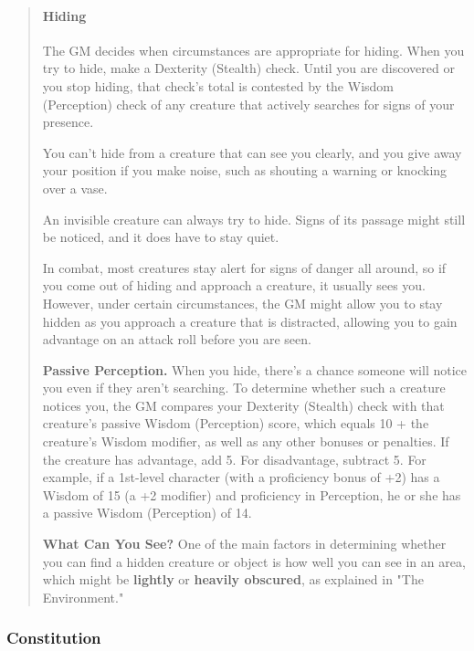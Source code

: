 \documentclass[
]{article}
\begin{document}
\begin{quote}
\mbox{}%
\hypertarget{hiding}{%
\paragraph{Hiding}\label{hiding}}

The GM decides when circumstances are appropriate for hiding. When you
try to hide, make a Dexterity (Stealth) check. Until you are discovered
or you stop hiding, that check's total is contested by the Wisdom
(Perception) check of any creature that actively searches for signs of
your presence.

You can't hide from a creature that can see you clearly, and you give
away your position if you make noise, such as shouting a warning or
knocking over a vase.

An invisible creature can always try to hide. Signs of its passage might
still be noticed, and it does have to stay quiet.

In combat, most creatures stay alert for signs of danger all around, so
if you come out of hiding and approach a creature, it usually sees you.
However, under certain circumstances, the GM might allow you to stay
hidden as you approach a creature that is distracted, allowing you to
gain advantage on an attack roll before you are seen.

\textbf{Passive Perception.} When you hide, there's a chance someone
will notice you even if they aren't searching. To determine whether such
a creature notices you, the GM compares your Dexterity (Stealth) check
with that creature's passive Wisdom (Perception) score, which equals 10
+ the creature's Wisdom modifier, as well as any other bonuses or
penalties. If the creature has advantage, add 5. For disadvantage,
subtract 5. For example, if a 1st-level character (with a proficiency
bonus of +2) has a Wisdom of 15 (a +2 modifier) and proficiency in
Perception, he or she has a passive Wisdom (Perception) of 14.

\textbf{What Can You See?} One of the main factors in determining
whether you can find a hidden creature or object is how well you can see
in an area, which might be \textbf{lightly} or \textbf{heavily
obscured}, as explained in "The Environment."
\end{quote}

\hypertarget{constitution}{%
\subsubsection{Constitution}\label{constitution}}
\end{document}
